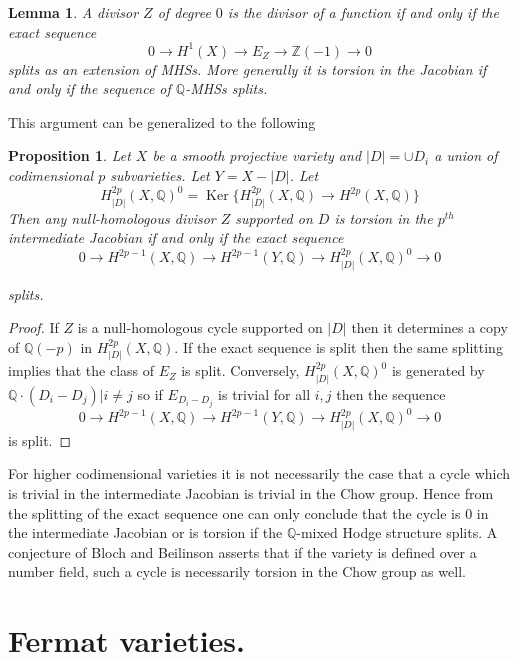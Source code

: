 \documentclass[12pt,reqno]{article}
\newtheorem{prop}[defn]{Proposition}
\newtheorem{lem}[defn]{Lemma}
\newcommand {\ZZ}{{\mathds Z}}
\newcommand {\Q}{{\mathds Q}}
\def\Ker{\operatorname{Ker}}
\begin{document}
	\begin{lem}
	A divisor $Z$ of degree $0$ is the divisor of a function if and only if the exact sequence
	$$0 \rightarrow H^1(X) \rightarrow E_Z \rightarrow \ZZ(-1) \rightarrow 0$$
	splits as an extension of MHSs. More generally it is torsion in the Jacobian  if and only if the sequence of $\Q$-MHSs splits.  
	
	\end{lem}
	
	
	This argument can be generalized to the following 
	
	\begin{prop} Let $X$ be a smooth projective variety and $|D|=\cup D_i$ a union of codimensional $p$ subvarieties. Let $Y=X-|D|$. Let 
		$$H^{2p}_{|D|}(X,\Q)^0= \Ker\{H^{2p}_{|D|}(X,\Q) \rightarrow H^{2p}(X,\Q)\}$$
		Then any null-homologous divisor $Z$ supported on $D$ is torsion in the $p^{th}$ intermediate Jacobian if and only if the exact sequence 
		$$0 \rightarrow H^{2p-1}(X,\Q) \rightarrow  H^{2p-1}(Y,\Q) \rightarrow H^{2p}_{|D|}(X,\Q)^0 \rightarrow 0$$
	
		splits.  
		\label{splitting}
		
	\end{prop}
	\begin{proof} If $Z$ is a null-homologous cycle supported on $|D|$ then it determines a copy of $\Q(-p)$ in $H^{2p}_{|D|}(X,\Q)$. If the exact sequence is split then the same splitting implies that the class of $E_Z$ is split. Conversely, $H^{2p}_{|D|}(X,\Q)^0$ is generated by $\Q\cdot (D_i-D_j)|i \neq j$ so if $E_{D_i-D_j}$ is trivial for all $i,j$ then the sequence 
			$$0 \rightarrow H^{2p-1}(X,\Q) \rightarrow  H^{2p-1}(Y,\Q) \rightarrow H^{2p}_{|D|}(X,\Q)^0 \rightarrow 0$$
		is split. 
		\end{proof}
		
	For higher codimensional varieties it is not necessarily the case that a cycle which is trivial in the intermediate Jacobian is trivial in the Chow group. Hence from the splitting of the exact sequence one can only conclude that the cycle is $0$ in the intermediate Jacobian or is torsion if the $\Q$-mixed Hodge structure splits. A conjecture of Bloch \cite{blochinjectivity} and Beilinson asserts that if the variety is defined over a number field, such a cycle is necessarily torsion in the Chow group as well.  
		
		
		
		
		
		\section{Fermat varieties.}
		
\end{document}
